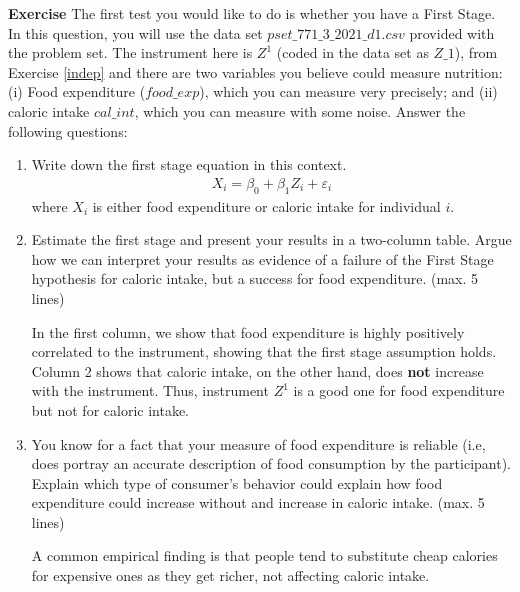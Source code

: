 \documentclass[10pt]{article}
\newcounter{exercise}
\newenvironment{exercise}%
{%
	\refstepcounter{exercise}%
	\textbf{Exercise \theexercise}%
	}%
{
 \par\vspace{\baselineskip}%
\noindent\ignorespacesafterend
}
\begin{document}
\begin{exercise}\label{substitution}
	The first test you would like to do is whether you have a First Stage. In this question, you will use the data set $pset\_771\_3\_2021\_d1.csv$ provided with the problem set. The instrument here is $ Z^1 $ (coded in the data set as $ Z\_1 $), from Exercise \ref{indep} and there are two variables you believe could measure nutrition: (i) Food expenditure ($ food\_exp $), which you can measure very precisely; and (ii) caloric intake $ cal\_int $, which you can measure with some noise. Answer the following questions:
	\begin{enumerate}
		\item Write down the first stage equation in this context.
		\color{red}
		\begin{align*}
		X_i = \beta_{0} + \beta_{1}Z_i + \varepsilon_{i}
		\end{align*}
		where $ X_i $ is either food expenditure or caloric intake for individual $ i $.
		\color{black}
		\item Estimate the first stage and present your results in a two-column table. Argue how we can interpret your results as evidence of a failure of the First Stage hypothesis for caloric intake, but a success for food expenditure. (max. 5 lines)
		
		\color{red}
		
		In the first column, we show that food expenditure is highly positively correlated to the instrument, showing that the first stage assumption holds.  Column 2 shows that caloric intake, on the other hand, does \textbf{not} increase with the instrument. Thus, instrument $ Z^1 $ is a good one for food expenditure but not for caloric intake.
	
		
		
		\color{black}
		
		\item You know for a fact that your measure of food expenditure is reliable (i.e, does portray an accurate description of food consumption by the participant). Explain which type of consumer's behavior could explain how food expenditure could increase without and increase in caloric intake. (max. 5 lines)
		
	
		\color{red}
		 A common empirical finding is that people tend to substitute cheap calories for expensive ones as they get richer, not affecting caloric intake.
		\color{black}

		
	\end{enumerate}
	
\end{exercise}
\end{document}
